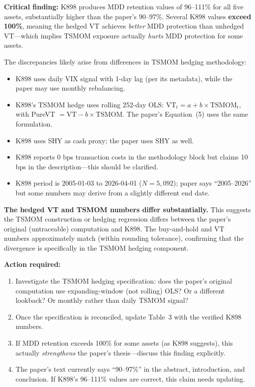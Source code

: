 \documentclass[12pt,a4paper]{article}
\begin{document}
\noindent\textbf{Critical finding:} K898 produces MDD retention values of 96--111\% for all five assets, substantially higher than the paper's 90--97\%. Several K898 values \textbf{exceed 100\%}, meaning the hedged VT achieves \textit{better} MDD protection than unhedged VT---which implies TSMOM exposure actually \textit{hurts} MDD protection for some assets.

The discrepancies likely arise from differences in TSMOM hedging methodology:
\begin{itemize}[nosep]
\item K898 uses daily VIX signal with 1-day lag (per its metadata), while the paper may use monthly rebalancing.
\item K898's TSMOM hedge uses rolling 252-day OLS: $\text{VT}_t = a + b \times \text{TSMOM}_t$, with PureVT $= \text{VT} - b \times \text{TSMOM}$. The paper's Equation~(5) uses the same formulation.
\item K898 uses SHY as cash proxy; the paper uses SHY as well.
\item K898 reports 0 bps transaction costs in the methodology block but claims 10 bps in the description---this should be clarified.
\item K898 period is 2005-01-03 to 2026-04-01 ($N = 5{,}092$); paper says ``2005--2026'' but some numbers may derive from a slightly different end date.
\end{itemize}

\noindent\textbf{The hedged VT and TSMOM numbers differ substantially.} This suggests the TSMOM construction or hedging regression differs between the paper's original (untraceable) computation and K898. The buy-and-hold and VT numbers approximately match (within rounding tolerance), confirming that the divergence is specifically in the TSMOM hedging component.

\noindent\textbf{Action required:}
\begin{enumerate}[nosep]
\item Investigate the TSMOM hedging specification: does the paper's original computation use expanding-window (not rolling) OLS? Or a different lookback? Or monthly rather than daily TSMOM signal?
\item Once the specification is reconciled, update Table~3 with the verified K898 numbers.
\item If MDD retention exceeds 100\% for some assets (as K898 suggests), this actually \textit{strengthens} the paper's thesis---discuss this finding explicitly.
\item The paper's text currently says ``90--97\%'' in the abstract, introduction, and conclusion. If K898's 96--111\% values are correct, this claim needs updating.
\end{enumerate}
\end{document}
